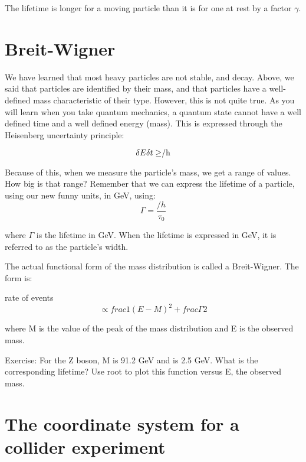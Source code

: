 The lifetime is longer for a moving particle than it is for one at rest by a factor $\gamma$.

\section{Breit-Wigner}

We have learned that most heavy particles are not stable, and decay.  Above, we said that particles are identified by their mass, and that particles have a well-defined mass characteristic of their type.  However, this is not quite true.  As you will learn when you take quantum mechanics, a quantum state cannot have a well defined time and a well defined energy (mass).  This is expressed through the Heisenberg uncertainty principle:

\begin{equation}
	 \delta E \delta t   \ge $\slash h$
\end{equation} 

Because of this, when we measure the particle’s mass, we get a range of values.  How big is that range?  Remember that we can express the lifetime of a particle, using our new funny units, in GeV, using:
 \begin{equation}
	 \Gamma =   \frac{\slash h}{\tau _0}
\end{equation} 
	  

where  $\Gamma$ is the lifetime in GeV.  When the lifetime is expressed in GeV,  it is referred to as the particle’s width.

The actual functional form of the mass distribution is called a Breit-Wigner.  The form is:

	 rate of events \begin{equation} \propto frac{1}{(E-M)^2 + frac{\Gamma}{2}} \end{equation} 

where M is the value of the peak of the mass distribution and E is the observed mass.

\begin{exercise}
Exercise:  For the Z boson, M is 91.2 GeV and   is 2.5 GeV.  What is the corresponding lifetime?  Use root to plot this function versus E, the observed mass.
\end{exercise}

\section{The coordinate system for a collider experiment}

